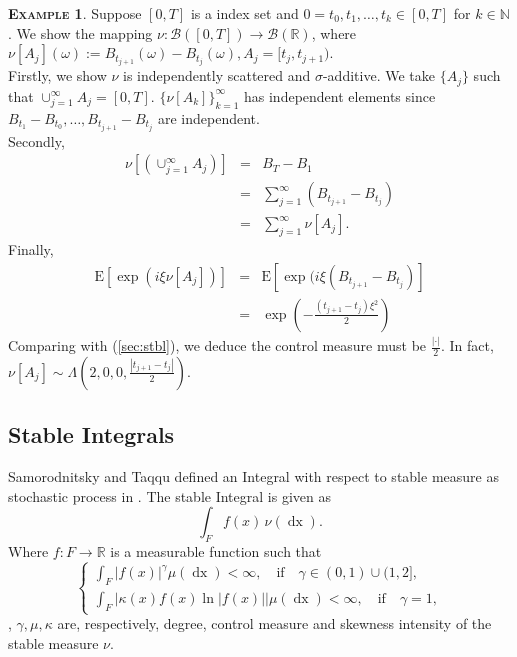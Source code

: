 \documentclass[a4paper, twoside, 11pt]{article}
\theoremstyle{definition}
\newtheorem{example}[definition]{\scshape Example}
\newcommand{\brkt}[1]{\left({#1} \right)}
\begin{document}
\begin{example}
  Suppose $[0, T]$ is a index set and $0=t_0, t_1,\dots, t_k \in [0, T]$ for $k\in \mathbb{N}$. We show the mapping $\nu : \mathscr{B}([0, T]) \rightarrow \mathscr{B}(\mathbb{R})$, where $\nu[A_j](\omega):= B_{t_{j+1}}(\omega) - B_{t_{j}}(\omega), A_j=[t_{j}, t_{j+1})$.\\
	Firstly, we show $\nu$ is independently scattered and $\sigma$-additive. We take $\{A_j\}$ such that $\cup_{j=1}^{\infty}A_j = [0, T]$. $\{\nu[A_k]\}_{k=1}^{\infty}$ has independent elements since $B_{t_1} - B_{t_0}, \dots,  B_{t_{j+1}}- B_{t_{j}} $ are independent.\\
	Secondly, 
	\begin{eqnarray*}
	  \nu[\brkt{\cup_{j=1}^{\infty}A_j}] &=& B_T - B_1\\
	  &=& \sum_{j=1}^{\infty} (B_{t_{j+1}} - B_{t_j})\\
	  &=& \sum_{j=1}^{\infty} \nu[A_j].
	\end{eqnarray*}
	Finally, 
	\begin{eqnarray*}
	  \mathrm{E}[\exp(i\xi\nu[A_j])] &=& \mathrm{E}[\exp(i\xi(B_{t_{j+1}} - B_{t_{j}})]\\
	  &=& \exp(-\frac{(t_{j+1}-t_j)\xi^2}{2})
	\end{eqnarray*}
	Comparing with (\ref{sec:stbl}), we deduce the control measure must be $\frac{|\cdot|}{2}$. In fact, $\nu[A_j] \sim \Lambda(2, 0, 0, \frac{|t_{j+1} - t_j|}{2})$.
  \label{sec:ex2}
\end{example}

\subsection{Stable Integrals}
Samorodnitsky and Taqqu defined an Integral with respect to stable measure as stochastic process in \cite{samorodnitsky}. The stable Integral is given as 
\begin{equation}
  \int_F f(x)\, \nu(\mathop{dx}).
  \label{sec:stbint}
\end{equation}
Where $f : F \rightarrow \mathbb{R}$ is a measurable function such that 
\begin{equation}
\begin{cases} \int_F |f(x)|^\gamma \mu(\mathop{dx}) < \infty,\hspace{1em} \text{if} \hspace{1em} \gamma \in (0, 1) \cup (1, 2],\\
	\int_F |\kappa(x) f(x) \ln|f(x)||\mu(\mathop{dx}) < \infty,\hspace{1em} \text{if} \hspace{1em} \gamma = 1,
  \end{cases}
\end{equation}
, $\gamma, \mu, \kappa$ are, respectively, degree, control measure and skewness intensity of the stable measure $\nu$.
\end{document}
